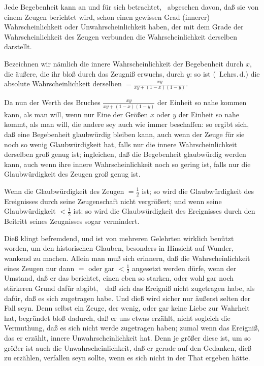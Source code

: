 \begin{aufza}
\item Jede Begebenheit kann an und für sich betrachtet, \dh\ abgesehen davon, daß sie von einem Zeugen berichtet wird, schon einen gewissen Grad (innerer) Wahrscheinlichkeit oder Unwahrscheinlichkeit haben, der mit dem Grade der Wahrscheinlichkeit des Zeugen verbunden die  Wahrscheinlichkeit derselben darstellt.
\item Bezeichnen wir nämlich die innere Wahrscheinlichkeit der Begebenheit durch $x$, die äußere, die ihr bloß durch das Zeugniß erwuchs, durch $y$:
so ist (\ Lehrs.\,d.) die absolute Wahrscheinlichkeit derselben $= \frac{xy}{xy+(1-x)(1-y)}$.
\item Da nun der Werth des Bruches $\frac{xy}{xy+(1-x)(1-y)}$ der Einheit so nahe kommen kann, als man will, wenn nur Eine der Größen $x$ oder $y$ der Einheit so nahe kommt, als man will, die andere sey auch wie immer beschaffen: so ergibt sich, daß eine Begebenheit glaubwürdig bleiben kann, auch wenn der Zeuge für sie noch so wenig Glaubwürdigkeit hat, falls nur die innere Wahrscheinlichkeit derselben groß genug ist; ingleichen, daß die Begebenheit glaubwürdig werden kann, auch wenn ihre innere Wahrscheinlichkeit noch so gering ist, falls nur die Glaubwürdigkeit des Zeugen groß genug ist.
\item Wenn die Glaubwürdigkeit des Zeugen $= \frac{1}{2}$ ist; so wird die Glaubwürdigkeit des Ereignisses durch seine Zeugenschaft nicht vergrößert; und wenn seine Glaubwürdigkeit $< \frac{1}{2}$ ist: so wird die Glaubwürdigkeit des Ereignisses durch den Beitritt seines Zeugnisses sogar vermindert.
\item Dieß klingt befremdend, und ist von mehreren Gelehrten wirklich benützt worden, um den historischen Glauben, besonders in Hinsicht auf Wunder, wankend zu machen. Allein man muß sich erinnern, daß die Wahrscheinlichkeit eines Zeugen nur dann $=$ oder gar $< \frac{1}{2}$ angesetzt werden dürfe, wenn der Umstand, daß er das  berichtet, einen eben so starken, oder wohl gar noch stärkeren Grund dafür abgibt,~\ daß sich das Ereigniß nicht zugetragen habe, als dafür, daß es sich zugetragen habe. Und dieß wird sicher nur äußerst selten der Fall seyn. Denn selbst ein Zeuge, der wenig, oder gar keine Liebe zur Wahrheit hat, begründet bloß dadurch, daß er uns etwas erzählt, nicht sogleich die Vermuthung, daß es sich nicht werde zugetragen haben; zumal wenn das Ereigniß, das er erzählt, innere Unwahrscheinlichkeit hat. Denn je größer diese ist, um so größer ist auch die Unwahrscheinlichkeit, daß er gerade auf den Gedanken, dieß zu erzählen, verfallen seyn sollte, wenn es sich nicht in der That ergeben hätte.
\end{aufza}

